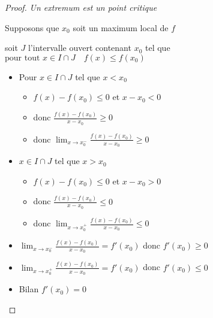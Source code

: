 \begin{frame}
\begin{proof}
\centerline{\emph{Un extremum est un point critique}}

\pause

Supposons que $x_0$ soit un maximum local de $f$

\pause

soit $J$ l'intervalle ouvert contenant $x_0$  tel que 
$\text{pour tout } x\in I \cap J \quad f(x) \le f(x_0)$
\pause
\begin{itemize}
  \item Pour $x \in I\cap J$ tel que $x < x_0$ 
\pause
  \begin{itemize}
    \item $f(x)-f(x_0) \le 0$ et $x-x_0<0$
\pause
    \item donc $\frac{f(x)-f(x_0)}{x-x_0} \ge 0$
\pause
    \item donc $\lim_{x \to x_0^-} \frac{f(x)-f(x_0)}{x-x_0} \ge 0$
  \end{itemize}
\pause
  \item $x \in I\cap J$ tel que $x > x_0$
\pause
  \begin{itemize}
    \item $f(x)-f(x_0) \le 0$ et $x-x_0>0$
\pause
    \item donc $\frac{f(x)-f(x_0)}{x-x_0} \le 0$
\pause
    \item donc $\lim_{x \to x_0^+} \frac{f(x)-f(x_0)}{x-x_0} \le 0$
  \end{itemize}
\pause
  \item $\lim_{x \to x_0^-} \frac{f(x)-f(x_0)}{x-x_0} = f'(x_0)$ donc $f'(x_0) \ge 0$ 
\pause
  \item $\lim_{x \to x_0^+} \frac{f(x)-f(x_0)}{x-x_0} = f'(x_0)$ donc $f'(x_0) \le 0$ 
\pause
  \item Bilan $f'(x_0)=0$
\end{itemize}
\vspace*{-2ex}
\end{proof}
\end{frame}



